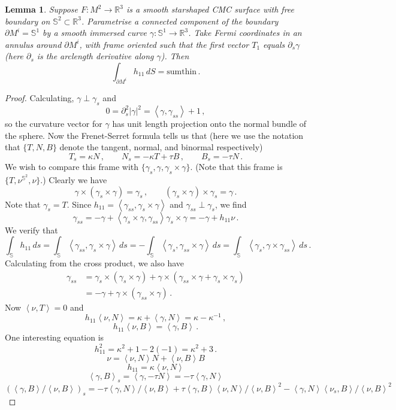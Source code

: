 \documentclass[10pt]{amsart}
\newcommand{\IP}[2]{\left< #1 , #2 \right>}
\newcommand{\R}{\ensuremath{\mathbb{R}}}
\renewcommand{\S}{\ensuremath{\mathbb{S}}}
\newtheorem{lem}[thm]{Lemma}
\theoremstyle{remark}
\begin{document}
\begin{lem}
Suppose $F:M^2\rightarrow\R^3$ is a smooth starshaped CMC surface with free boundary on
$\S^2\subset\R^{3}$.
Parametrise a connected component of the boundary $\partial M^i = \S^1$ by a smooth immersed curve $\gamma:\S^1\rightarrow\R^3$.
Take Fermi coordinates in an annulus around $\partial M^i$, with frame oriented
such that the first vector $T_1$ equals $\partial_s\gamma$ (here $\partial_s$
is the arclength derivative along $\gamma$).
Then
\[
	\int_{\partial M^i} h_{11}\,dS = \text{sumthin}\,.
\]
\end{lem}
\begin{proof}
Calculating, $\gamma \perp \gamma_s$ and
\[
	0 = \partial^2_s|\gamma|^2 = \IP{\gamma}{\gamma_{ss}} + 1
	\,,
\]
so the curvature vector for $\gamma$ has unit length projection onto the normal bundle of the sphere.
Now the Frenet-Serret formula tells us that (here we use the notation that
$\{T,N,B\}$ denote the tangent, normal, and binormal respectively)
\[
	T_s = \kappa N\,,\qquad
	N_s = -\kappa T + \tau B\,,\qquad
	B_s = -\tau N\,.
\]
We wish to compare this frame with $\{\gamma_s,\gamma,\gamma_s\times\gamma\}$.
(Note that this frame is $\{T,\nu^{\S^2},\nu\}$.)
Clearly we have
\[
	\gamma\times (\gamma_s\times\gamma) = \gamma_s\,,\qquad
	(\gamma_s\times\gamma)\times\gamma_s = \gamma\,.
\]
Note that $\gamma_s = T$.
Since $h_{11} = \IP{\gamma_{ss}}{\gamma_s\times\gamma}$ and $\gamma_{ss} \perp \gamma_s$, we find
\[
	\gamma_{ss} = -\gamma + \IP{\gamma_s\times\gamma}{\gamma_{ss}}\gamma_s\times\gamma
	 = -\gamma + h_{11}\nu
	\,.
\]
We verify that
\[
	\int_{\S} h_{11}\,ds
	= \int_{\S} \IP{\gamma_{ss}}{\gamma_s\times\gamma}\,ds
	= - \int_{\S} \IP{\gamma_{s}}{\gamma_{ss}\times\gamma}\,ds
	=   \int_{\S} \IP{\gamma_{s}}{\gamma\times\gamma_{ss}}\,ds
	\,.
\]
Calculating from the cross product, we also have
\begin{align*}
	\gamma_{ss} &= \gamma_s\times(\gamma_s\times\gamma)
	+ \gamma\times(\gamma_{ss}\times\gamma + \gamma_s\times\gamma_s)
	\\&=
	               -\gamma
		       + \gamma\times(\gamma_{ss}\times\gamma)
		       \,.
\end{align*}
Now $\IP{\nu}{T} = 0$ and 
\[
	h_{11}\IP{\nu}{N} = \kappa + \IP{\gamma}{N} = \kappa - \kappa^{-1}
	\,,
\]
\[
	h_{11}\IP{\nu}{B} = \IP{\gamma}{B}
	\,.
\]
One interesting equation is
\[
	h_{11}^2 = \kappa^2 + 1 - 2(-1) = \kappa^2 + 3\,.
\]
\[
	\nu = \IP{\nu}{N}N + \IP{\nu}{B}B
\]
\[
	h_{11} = \kappa\IP{\nu}{N}
\]
\[
	\IP{\gamma}{B}_s = \IP{\gamma}{-\tau N} = -\tau\IP{\gamma}{N}
\]
\[
	(\IP{\gamma}{B}/\IP{\nu}{B})_s
	= -\tau\IP{\gamma}{N}/\IP{\nu}{B} + \tau\IP{\gamma}{B}\IP{\nu}{N}/\IP{\nu}{B}^2 - \IP{\gamma}{N}\IP{\nu_s}{B}/\IP{\nu}{B}^2
\]
\end{proof}
\end{document}
